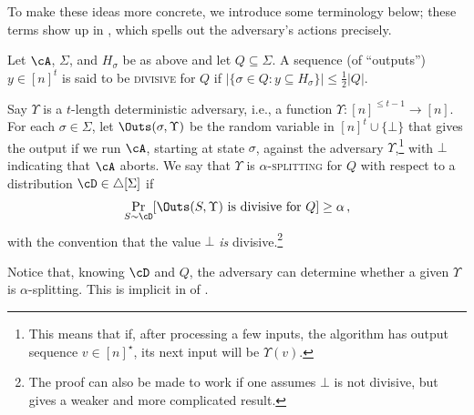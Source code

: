 \begin{itemize}
\begin{itemize}
To make these ideas more concrete, we introduce some terminology below; these
terms show up in , which spells out the adversary's
actions precisely.
%
\begin{definition}\label{def:rt-defs}
  Let $\cA$, $\Sigma$, and $H_\sigma$ be as above and let $Q \subseteq
  \Sigma$.  A sequence (of ``outputs'') $y \in [n]^t$ is said to be
  \textsc{divisive} for $Q$ if $|\{\sigma \in Q : y \subseteq H_\sigma\}| \le
  \frac{1}{2} |Q|$.

  Say $\Upsilon$ is a $t$-length deterministic adversary, i.e., a function
  $\Upsilon \colon [n]^{\le t-1} \to [n]$.  For each $\sigma \in \Sigma$, let
  $\Outs(\sigma, \Upsilon)$ be the random variable in $[n]^t \cup \{\bot\}$
  that gives the output if we run $\cA$, starting at state $\sigma$, against
  the adversary $\Upsilon$,\footnote{This means that if, after processing a
  few inputs, the algorithm has output sequence $v \in [n]^\star$, its next
  input will be $\Upsilon(v)$.} with $\bot$ indicating that $\cA$ aborts. 
  We say that $\Upsilon$ is $\alpha$-\textsc{splitting} for $Q$ with respect
  to a distribution $\cD \in \triangle[\Sigma]$ if
  \begin{align*}
    \Pr_{S \sim \cD}[\text{$\Outs(S, \Upsilon)$ is divisive for $Q$}] \ge \alpha \,,
  \end{align*} 
  with the convention that the value $\bot$ \emph{is} divisive.\footnote{The proof can also be made to work if one assumes $\bot$ is not divisive, but gives a weaker and more complicated result.}
\end{definition}

Notice that, knowing $\cD$ and $Q$, the adversary can determine whether a
given $\Upsilon$ is $\alpha$-splitting. This is implicit in 
 of .

\end{itemize}
\end{itemize}
